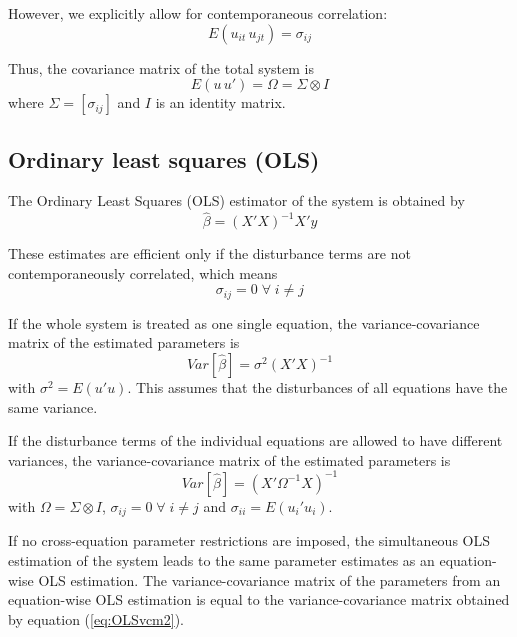 However, we explicitly allow for contemporaneous correlation:
\begin{equation}
   E \left( u_{it} \, u_{jt} \right) = \sigma_{ij}
\end{equation}

Thus, the covariance matrix of the total system is
\begin{equation}
   E \left( u \, u' \right) = \Omega = \Sigma \otimes I
\end{equation}
where $\Sigma = \left[ \sigma_{ij} \right]$ and $I$ is an
identity matrix.


\subsection{Ordinary least squares (OLS)}

The Ordinary Least Squares (OLS) estimator of the system 
is obtained by
\begin{equation}
   \widehat{\beta} = \left( X'X \right)^{-1} X'y
\end{equation}

These estimates are efficient only if the disturbance terms are not 
contemporaneously correlated, which means 
\begin{equation}
   \sigma_{ij} = 0 \; \forall \; i \neq j
\end{equation}

If the whole system is treated as one single equation, 
the variance-covariance matrix of the estimated parameters is
\begin{equation}
   Var \left[ \widehat{\beta} \right] = \sigma^2 \left( X'X \right)^{-1}
\end{equation}
with $\sigma^2 = E \left( u' u \right)$.
This assumes that the disturbances of all equations have the
same variance.

If the disturbance terms of the individual equations 
are allowed to have different variances, 
the variance-covariance matrix of the estimated parameters is
\begin{equation}
   Var \left[ \widehat{\beta} \right] = \left( X' \Omega^{-1} X \right)^{-1}
   \label{eq:OLSvcm2}
\end{equation}
with $\Omega = \Sigma \otimes I$, 
$\sigma_{ij} = 0 \; \forall \; i \neq j$ and
$\sigma_{ii} = E \left( u_i' u_i \right)$.

If no cross-equation parameter restrictions are imposed, the simultaneous 
OLS estimation of the system leads to the same parameter estimates 
as an equation-wise OLS estimation. The variance-covariance matrix 
of the parameters from an equation-wise OLS estimation is equal to 
the variance-covariance matrix obtained by equation 
(\ref{eq:OLSvcm2}).


